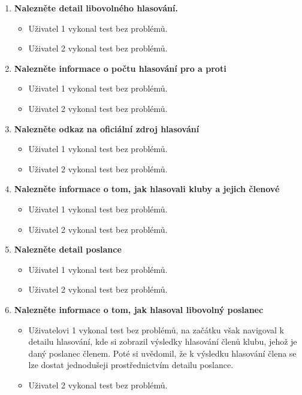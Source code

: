 \begin{enumerate}
	\item \textbf{Nalezněte detail libovolného hlasování.}
	
		\begin{itemize}
			\item Uživatel 1 vykonal test bez problémů.
			\item Uživatel 2 vykonal test bez problémů.
		\end{itemize}
	
	\item \textbf{Nalezněte informace o počtu hlasování pro a proti}
	
		\begin{itemize}
			\item Uživatel 1 vykonal test bez problémů.
			\item Uživatel 2 vykonal test bez problémů.
		\end{itemize}
	
	\item \textbf{Nalezněte odkaz na oficiální zdroj hlasování}
	
		\begin{itemize}
			\item Uživatel 1 vykonal test bez problémů.
			\item Uživatel 2 vykonal test bez problémů.
		\end{itemize}
	
	\item \textbf{Nalezněte informace o tom, jak hlasovali kluby a jejich členové}
	
		\begin{itemize}
			\item Uživatel 1 vykonal test bez problémů.
			\item Uživatel 2 vykonal test bez problémů.
		\end{itemize}
		
	
	\item \textbf{Nalezněte detail poslance}
	
		\begin{itemize}
			\item Uživatel 1 vykonal test bez problémů.
			\item Uživatel 2 vykonal test bez problémů.
		\end{itemize}
	
	
	\item \textbf{Nalezněte informace o tom, jak hlasoval libovolný poslanec}
	
		\begin{itemize}
				\item Uživatelovi 1 vykonal test bez problémů, na začátku však navigoval k detailu hlasování, kde si zobrazil výsledky hlasování členů klubu, jehož je daný poslanec členem. Poté si uvědomil, že k výsledku hlasování člena se lze dostat jednodušeji prostřednictvím detailu poslance.
			\item Uživatel 2 vykonal test bez problémů.
		\end{itemize}
	

\end{enumerate}
